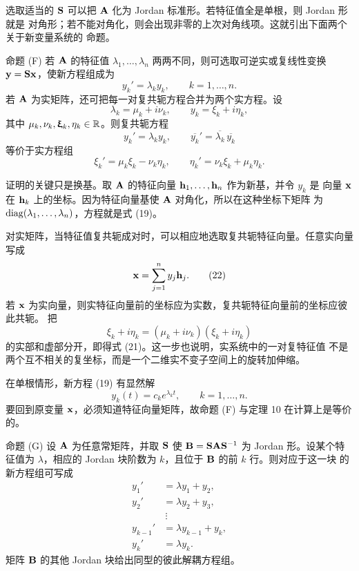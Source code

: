 选取适当的 \(\mathbf{S}\) 可以把 \(\mathbf{A}\) 化为 Jordan 标准形。若特征值全是单根，则 Jordan 形就是
对角形；若不能对角化，则会出现非零的上次对角线项。这就引出下面两个关于新变量系统的
命题。

\begin{sourceitem}{命题 (F)}
若 \(\mathbf{A}\) 的特征值 \(\lambda_1,\ldots,\lambda_n\) 两两不同，则可选取可逆实或复线性变换
\(\vect{y}=\mat{S}\vect{x}\)，使新方程组成为
\begin{equation}
 y_k'=\lambda_k y_k,\qquad k=1,\ldots,n.
 \tag{19}
\end{equation}
若 \(\mathbf{A}\) 为实矩阵，还可把每一对复共轭方程合并为两个实方程。设
\begin{equation}
 \lambda_k=\mu_k+i\nu_k,\qquad
 y_k=\xi_k+i\eta_k,
 \tag{20}
\end{equation}
其中 \(\mu_k,\nu_k,\bm{\upxi}_k,\eta_k\in\mathbb R\)。则复共轭方程
\[
 y_k'=\lambda_k y_k,\qquad
 \overline{y_k}'=\overline{\lambda_k}\,\overline{y_k}
\]
等价于实方程组
\begin{equation}
 \xi_k'=\mu_k\xi_k-\nu_k\eta_k,\qquad
 \eta_k'=\nu_k\xi_k+\mu_k\eta_k.
 \tag{21}
\end{equation}
\end{sourceitem}

证明的关键只是换基。取 \(\mathbf{A}\) 的特征向量 \(\vect{h}_1,\ldots,\vect{h}_n\) 作为新基，并令 \(y_k\) 是
向量 \(\vect{x}\) 在 \(\vect{h}_k\) 上的坐标。因为特征向量基使 \(\mathbf{A}\) 对角化，所以在这种坐标下矩阵
为 \(\operatorname{diag}(\lambda_1,\ldots,\lambda_n)\)，方程就是式 (19)。

对实矩阵，当特征值复共轭成对时，可以相应地选取复共轭特征向量。任意实向量写成
\begin{equation}
 \vect{x}=\sum_{j=1}^{n}y_j\vect{h}_j.
 \tag{22}
\end{equation}
若 \(\vect{x}\) 为实向量，则实特征向量前的坐标应为实数，复共轭特征向量前的坐标应彼此共轭。
把
\[
 \xi_k+i\eta_k
 =(\mu_k+i\nu_k)(\xi_k+i\eta_k)
\]
的实部和虚部分开，即得式 (21)。这一步也说明，实系统中的一对复特征值
不是两个互不相关的复坐标，而是一个二维实不变子空间上的旋转加伸缩。

在单根情形，新方程 (19) 有显然解
\[
 y_k(t)=c_ke^{\lambda_k t},\qquad k=1,\ldots,n.
\]
要回到原变量 \(\vect{x}\)，必须知道特征向量矩阵，故命题 (F) 与定理 10 在计算上是等价的。

\begin{sourceitem}{命题 (G)}
设 \(\mathbf{A}\) 为任意常矩阵，并取 \(\mathbf{S}\) 使 \(\mathbf{B}=\mathbf{S}\mathbf{A}\mathbf{S}^{-1}\) 为 Jordan 形。设某个特征值为
\(\lambda\)，相应的 Jordan 块阶数为 \(k\)，且位于 \(\mathbf{B}\) 的前 \(k\) 行。则对应于这一块
的新方程组可写成
\begin{equation}
 \begin{aligned}
  y_1'&=\lambda y_1+y_2,\\
  y_2'&=\lambda y_2+y_3,\\
  &\ \vdots\\
  y_{k-1}'&=\lambda y_{k-1}+y_k,\\
  y_k'&=\lambda y_k.
 \end{aligned}
 \tag{23}
\end{equation}
矩阵 \(\mathbf{B}\) 的其他 Jordan 块给出同型的彼此解耦方程组。
\end{sourceitem}

